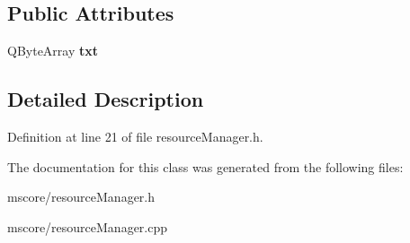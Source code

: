 \subsection*{Public Attributes}
\begin{DoxyCompactItemize}
\item 
\mbox{\label{class_ms_1_1_resource_manager_aa79239a3496d8e230dc1ce10e8695bcf}} 
Q\+Byte\+Array {\bfseries txt}
\end{DoxyCompactItemize}


\subsection{Detailed Description}


Definition at line 21 of file resource\+Manager.\+h.



The documentation for this class was generated from the following files\+:\begin{DoxyCompactItemize}
\item 
mscore/resource\+Manager.\+h\item 
mscore/resource\+Manager.\+cpp\end{DoxyCompactItemize}
